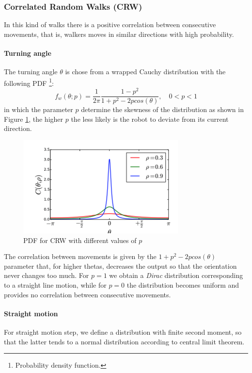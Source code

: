 \documentclass[10pt,a4paper]{article}
\begin{document}
\subsubsection{Correlated Random Walks (CRW)}
In this kind of walks there is a positive correlation between consecutive movements, that is, walkers moves in similar directions with high probability. 

\paragraph{Turning angle}
The turning angle $\theta$ is chose from a wrapped Cauchy distribution with the following PDF \footnote{Probability density function.}:
\[f_w(\theta; p)=\frac{1}{2 \pi}\frac{1-p^2}{1+p^2-2pcos(\theta)},\quad 0<p<1\]
in which the parameter $p$ determine the skewness of the distribution as shown in Figure \ref{fig:crw_pdf}, the higher $p$ the less likely is the robot to deviate from its current direction. 


\begin{figure}[t]
\centering
\includegraphics[scale=0.8]{images/random_walk.png}
\caption{PDF for CRW with different values of $p$}
\label{fig:crw_pdf}
\end{figure}

The correlation between movements is given by the $1+p^2-2pcos(\theta)$ parameter that, for higher thetas, decreases the output so that the orientation never changes too  much.
For $p=1$ we obtain a \textit{Dirac} distribution corresponding to a straight line motion, while for $p=0$ the distribution becomes uniform and provides no correlation between consecutive movements.

\paragraph{Straight motion}
For straight motion step, we define a distribution with finite second moment, so that the latter tends to a normal distribution according to central limit theorem.
\end{document}
